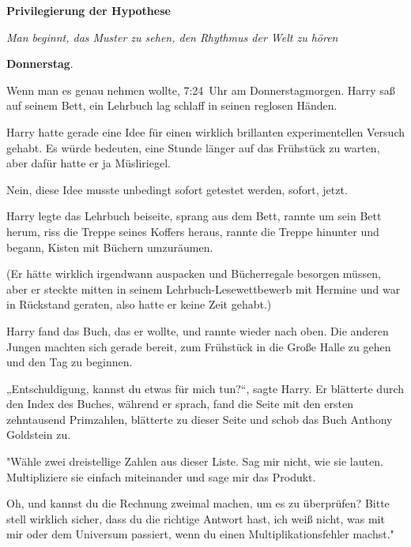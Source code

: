 

\hypertarget{privilegierung-der-hypothese}{%

\textbf{Privilegierung der Hypothese}

\emph{Man beginnt, das Muster zu sehen, den Rhythmus der Welt zu hören}

\textbf{Donnerstag}.

Wenn man es genau nehmen wollte, 7:24~Uhr am Donnerstagmorgen. Harry saß auf seinem Bett, ein Lehrbuch lag schlaff in seinen reglosen Händen.

Harry hatte gerade eine Idee für einen wirklich brillanten experimentellen Versuch gehabt. Es würde bedeuten, eine Stunde länger auf das Frühstück zu warten, aber dafür hatte er ja Müsliriegel.

Nein, diese Idee musste unbedingt sofort getestet werden, sofort, jetzt.

Harry legte das Lehrbuch beiseite, sprang aus dem Bett, rannte um sein Bett herum, riss die Treppe seines Koffers heraus, rannte die Treppe hinunter und begann, Kisten mit Büchern umzuräumen.

(Er hätte wirklich irgendwann auspacken und Bücherregale besorgen müssen, aber er steckte mitten in seinem Lehrbuch-Lesewettbewerb mit Hermine und war in Rückstand geraten, also hatte er keine Zeit gehabt.)

Harry fand das Buch, das er wollte, und rannte wieder nach oben. Die anderen Jungen machten sich gerade bereit, zum Frühstück in die Große Halle zu gehen und den Tag zu beginnen.

„Entschuldigung, kannst du etwas für mich tun?“, sagte Harry. Er blätterte durch den Index des Buches, während er sprach, fand die Seite mit den ersten zehntausend Primzahlen, blätterte zu dieser Seite und schob das Buch Anthony Goldstein zu.

"Wähle zwei dreistellige Zahlen aus dieser Liste. Sag mir nicht, wie sie lauten. Multipliziere sie einfach miteinander und sage mir das Produkt.

Oh, und kannst du die Rechnung zweimal machen, um es zu überprüfen? Bitte stell wirklich sicher, dass du die richtige Antwort hast, ich weiß nicht, was mit mir oder dem Universum passiert, wenn du einen Multiplikationsfehler machst."

}
